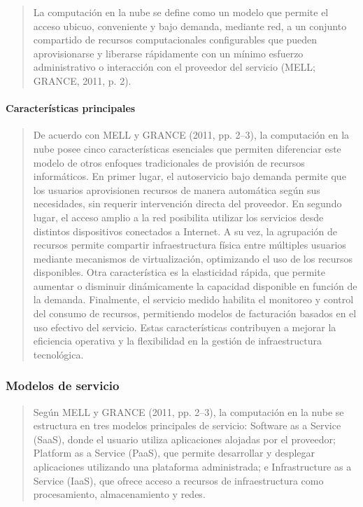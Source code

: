 \documentclass[
]{article}
\begin{document}
\begin{quote}
La computación en la nube se define como un modelo que permite el acceso
ubicuo, conveniente y bajo demanda, mediante red, a un conjunto
compartido de recursos computacionales configurables que pueden
aprovisionarse y liberarse rápidamente con un mínimo esfuerzo
administrativo o interacción con el proveedor del servicio (MELL;
GRANCE, 2011, p. 2).
\end{quote}

\paragraph{Características
principales}\label{caracteruxedsticas-principales}

\begin{quote}
De acuerdo con MELL y GRANCE (2011, pp. 2--3), la computación en la nube
posee cinco características esenciales que permiten diferenciar este
modelo de otros enfoques tradicionales de provisión de recursos
informáticos. En primer lugar, el autoservicio bajo demanda permite que
los usuarios aprovisionen recursos de manera automática según sus
necesidades, sin requerir intervención directa del proveedor. En segundo
lugar, el acceso amplio a la red posibilita utilizar los servicios desde
distintos dispositivos conectados a Internet. A su vez, la agrupación de
recursos permite compartir infraestructura física entre múltiples
usuarios mediante mecanismos de virtualización, optimizando el uso de
los recursos disponibles. Otra característica es la elasticidad rápida,
que permite aumentar o disminuir dinámicamente la capacidad disponible
en función de la demanda. Finalmente, el servicio medido habilita el
monitoreo y control del consumo de recursos, permitiendo modelos de
facturación basados en el uso efectivo del servicio. Estas
características contribuyen a mejorar la eficiencia operativa y la
flexibilidad en la gestión de infraestructura tecnológica.
\end{quote}

\subsubsection{Modelos de servicio}\label{modelos-de-servicio}

\begin{quote}
Según MELL y GRANCE (2011, pp. 2--3), la computación en la nube se
estructura en tres modelos principales de servicio: Software as a
Service (SaaS), donde el usuario utiliza aplicaciones alojadas por el
proveedor; Platform as a Service (PaaS), que permite desarrollar y
desplegar aplicaciones utilizando una plataforma administrada; e
Infrastructure as a Service (IaaS), que ofrece acceso a recursos de
infraestructura como procesamiento, almacenamiento y redes.
\end{quote}
\end{document}

